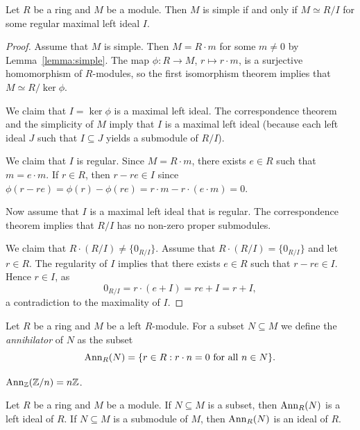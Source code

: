 \begin{proposition}
	\label{proposition:R/I}
	Let $R$ be a ring and $M$ be a module. Then $M$ is simple if and only if
	$M\simeq R/I$ for some regular maximal left ideal $I$. 	
\end{proposition}

\begin{proof}
	Assume that $M$ is simple. Then $M=R\cdot m$ for some $m\ne0$ by 
	Lemma~\ref{lemma:simple}. The map $\phi\colon R\to M$, $r\mapsto r\cdot m$, 
	is a surjective homomorphism of $R$-modules, 
	so the first isomorphism theorem implies that 
	$M\simeq R/\ker\phi$. 
	
	We claim that $I=\ker\phi$ is a maximal left ideal. 
	The correspondence theorem 
	and the simplicity of $M$ imply that $I$ is a 
	maximal left ideal (because each left ideal $J$ such that 
	$I\subseteq J$ yields a submodule of $R/I$).

  We claim that $I$ is regular. Since $M=R\cdot m$, there exists $e\in R$ such
  that $m=e\cdot m$. If $r\in R$, then $r-re\in I$ since
  $\phi(r-re)=\phi(r)-\phi(re)=r\cdot m-r\cdot (e\cdot m)=0$.

    Now assume that $I$ is a maximal left ideal that is regular. 
    The correspondence theorem implies that 
    $R/I$ has no non-zero proper submodules. 
    
    We claim that 
    $R\cdot (R/I)\ne\{0_{R/I}\}$. Assume that $R\cdot (R/I)=\{0_{R/I}\}$ and let $r\in R$. 
    The regularity of $I$ implies that 
    there exists $e\in R$ such that $r-re\in I$. Hence $r\in I$, as  
	\[
    0_{R/I}=r\cdot (e+I)=re+I=r+I,
	\]
	a contradiction to the maximality of $I$. 
\end{proof}

Let $R$ be a ring and $M$ be a left $R$-module. For a 
subset $N\subseteq M$
we define the \emph{annihilator} of $N$ as the subset 
\[
\operatorname{Ann}_R(N)=\{r\in R:r\cdot n=0\text{ for all }n\in N\}.
\]

\begin{example}
	$\operatorname{Ann}_{\mathbb{Z}}(\mathbb{Z}/n)=n\mathbb{Z}$.
\end{example}

\begin{exercise}
    Let $R$ be a ring and $M$ be a module. If $N\subseteq M$ is a subset, then
    $\operatorname{Ann}_R(N)$ is a left ideal of $R$. If $N\subseteq M$ is a submodule of
    $M$, then $\operatorname{Ann}_R(N)$ is an ideal of $R$. 
\end{exercise}

